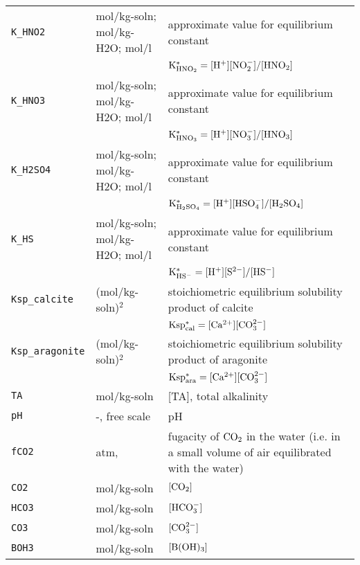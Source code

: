 \documentclass[article,nojss]{jss}
\begin{document}
\begin{footnotesize}
\begin{longtable}{l|l|p{7cm}}
\texttt{K\_HNO2}     &mol/kg-soln; mol/kg-H2O; mol/l   & approximate value for equilibrium constant \\
            &                                 & $\rm K^*_{HNO_2} = [H^+][NO_2^-] / [HNO_2]$\\         
\texttt{K\_HNO3}     &mol/kg-soln; mol/kg-H2O; mol/l   & approximate value for equilibrium constant \\
            &                                 & $\rm K^*_{HNO_3} = [H^+][NO_3^-] / [HNO_3]$\\              
\texttt{K\_H2SO4}    &mol/kg-soln; mol/kg-H2O; mol/l   & approximate value for equilibrium constant \\
            &                                 & $\rm K^*_{H_2SO_4} = [H^+][HSO_4^-] / [H_2SO_4]$\\    
\texttt{K\_HS}       & mol/kg-soln; mol/kg-H2O; mol/l  & approximate value for equilibrium constant \\
            &                                 & $\rm K^*_{HS^-} = [H^+][S^{2-}] / [HS^-]$\\
\texttt{Ksp\_calcite}& (mol/kg-soln)$^2$               & stoichiometric equilibrium solubility product of calcite\\
            &                                 & $\rm Ksp^*_{cal} = [Ca^{2+}][CO_3^{2-}]$\\
\texttt{Ksp\_aragonite} &(mol/kg-soln)$^2$             & stoichiometric equilibrium solubility product of aragonite\\
            &                                 & $\rm Ksp^*_{ara} = [Ca^{2+}][CO_3^{2-}]$\\
\texttt{TA}          & mol/kg-soln                     & [TA], total alkalinity\\
\texttt{pH}          & -, free scale                   & pH\\              
\texttt{fCO2}        & atm,                            & fugacity of $\rm CO_2$ in the water (i.e. in a small volume of air equilibrated with the water)\\
\texttt{CO2}         & mol/kg-soln                     & $[\rm CO_2]$\\         
\texttt{HCO3}        & mol/kg-soln                     & $[\rm HCO_3^-]$\\         
\texttt{CO3}         & mol/kg-soln                     & $[\rm CO_3^{2-}]$\\         
\texttt{BOH3}        & mol/kg-soln                     & $[\rm B(OH)_3]$\\         

\end{longtable}
\end{footnotesize}
\end{document}
